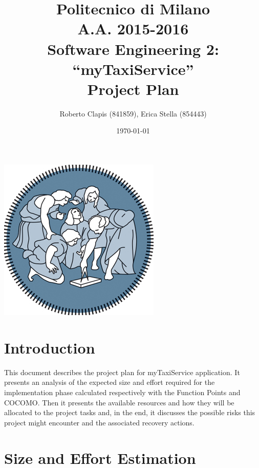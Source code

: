 \documentclass{article}
\author{Roberto Clapis (841859), Erica Stella (854443)}
\date{\today}
\title{Politecnico di Milano
	\\A.A. 2015\@-\@2016
	\\Software Engineering 2: ``myTaxiService''
	\\\textbf{P}roject \textbf{P}lan}
\begin{document}
\maketitle
\begin{center}
	\includegraphics{polimi-logo}
\end{center}
\clearpage
\tableofcontents
\clearpage
\section{Introduction}
This document describes the project plan for myTaxiService application.
It presents an analysis of the expected size and effort required 
for the implementation phase calculated respectively with the Function
Points and COCOMO\@. Then it presents the available resources and how 
they will be allocated to the project tasks and, in the end, it
discusses the possible risks this project might encounter and the
associated recovery actions.
\section{Size and Effort Estimation}
\end{document}
